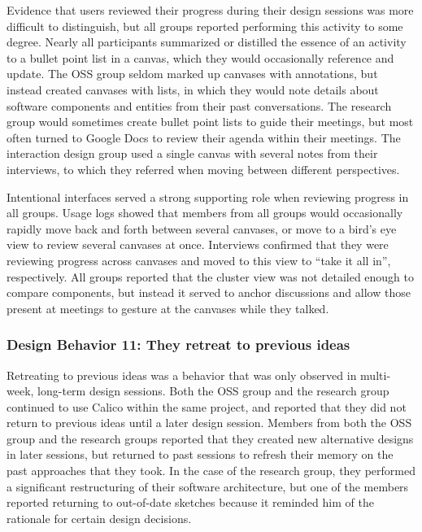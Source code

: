 \documentclass[12pt,fleqn]{ucithesis}
\begin{document}
Evidence that users reviewed their progress during their design sessions was more difficult to distinguish, but all groups reported performing this activity to some degree. Nearly all participants summarized or distilled the essence of an activity to a bullet point list in a canvas, which they would occasionally reference and update. The OSS group seldom marked up canvases with annotations, but instead created canvases with lists, in which they would note details about software components and entities from their past conversations. The research group would sometimes create bullet point lists to guide their meetings, but most often turned to Google Docs to review their agenda within their meetings. The interaction design group used a single canvas with several notes from their interviews, to which they referred when moving between different perspectives. 

Intentional interfaces served a strong supporting role when reviewing progress in all groups. Usage logs showed that members from all groups would occasionally rapidly move back and forth between several canvases, or move to a bird's eye view to review several canvases at once. Interviews confirmed that they were reviewing progress across canvases and moved to this view to ``take it all in'', respectively. All groups reported that the cluster view was not detailed enough to compare components, but instead it served to anchor discussions and allow those present at meetings to gesture at the canvases while they talked.

\subsubsection{Design Behavior 11: They retreat to previous ideas}

Retreating to previous ideas was a behavior that was only observed in multi-week, long-term design sessions. Both the OSS group and the research group  continued to use Calico within the same project, and reported that they did not return to previous ideas until a later design session. Members from both the OSS group and the research groups reported that they created new alternative designs in later sessions, but returned to past sessions to refresh their memory on the past approaches that they took. In the case of the research group, they performed a significant restructuring of their software architecture, but one of the members reported returning to out-of-date sketches because it reminded him of the rationale for certain design decisions.
\end{document}
